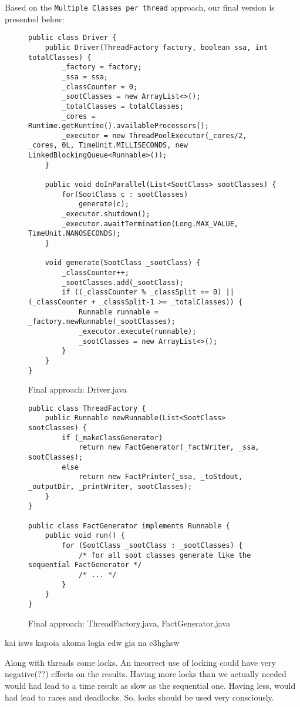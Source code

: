 \documentclass{dithesis}
\begin{document}
        Based on the \texttt{Multiple Classes per thread} approach, our final version is presented below:  
                \begin{figure}[H]
\begin{lstlisting}
public class Driver {
    public Driver(ThreadFactory factory, boolean ssa, int totalClasses) {
        _factory = factory;
        _ssa = ssa;
        _classCounter = 0;
        _sootClasses = new ArrayList<>();
        _totalClasses = totalClasses;
        _cores = Runtime.getRuntime().availableProcessors();
        _executor = new ThreadPoolExecutor(_cores/2, _cores, 0L, TimeUnit.MILLISECONDS, new LinkedBlockingQueue<Runnable>());
    }

    public void doInParallel(List<SootClass> sootClasses) {
        for(SootClass c : sootClasses)
            generate(c);
        _executor.shutdown();
        _executor.awaitTermination(Long.MAX_VALUE, TimeUnit.NANOSECONDS);
    }

    void generate(SootClass _sootClass) {
        _classCounter++;
        _sootClasses.add(_sootClass);
        if ((_classCounter % _classSplit == 0) || (_classCounter + _classSplit-1 >= _totalClasses)) {
            Runnable runnable = _factory.newRunnable(_sootClasses);
            _executor.execute(runnable);
            _sootClasses = new ArrayList<>();
        }
    }
}
\end{lstlisting}
        \caption{Final approach: Driver.java}
        \end{figure}

        \begin{figure}[H]
\begin{lstlisting}
public class ThreadFactory {
    public Runnable newRunnable(List<SootClass> sootClasses) {
        if (_makeClassGenerator)
            return new FactGenerator(_factWriter, _ssa, sootClasses);
        else
            return new FactPrinter(_ssa, _toStdout, _outputDir, _printWriter, sootClasses);
    }
}

public class FactGenerator implements Runnable {
    public void run() {
        for (SootClass _sootClass : _sootClasses) {
            /* for all soot classes generate like the sequential FactGenerator */
            /* ... */
        }
    }
}
\end{lstlisting}
        \caption{Final approach: ThreadFactory.java, FactGenerator.java}
        \end{figure}
kai isws kapoia akoma logia edw gia na e3hghsw 


	Along with threads come locks. An incorrect use of locking could have very negative(??) effects on the results. Having more locks than we actually needed would had lead to a time result as slow as the sequential one. Having less, would had lead to races and deadlocks. So, locks should be used very consciously.
\end{document}
